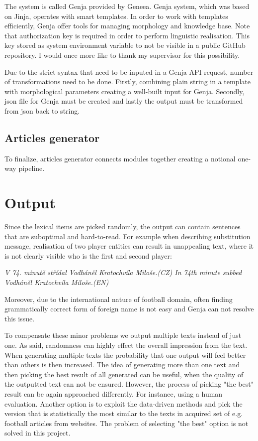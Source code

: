The system is called Genja provided by Geneea. Genja system, which was based on Jinja, operates with smart templates. In order to work with templates efficiently, Genja offer tools for managing morphology and knowledge base. Note that authorization key is required in order to perform linguistic realisation. This key stored as system environment variable to not be visible in a public GitHub repository. I would once more like to thank my supervisor for this possibility.

Due to the strict syntax that need to be inputed in a Genja API request, number of transformations need to be done. Firstly, combining plain string in a template with morphological parameters creating a well-built input for Genja. Secondly, json file for Genja must be created and lastly the output must be transformed from json back to string.

\subsection{Articles generator}
To finalize, articles generator connects modules together creating a notional one-way pipeline. 

\section{Output}
Since the lexical items are picked randomly, the output can contain sentences that are suboptimal and hard-to-read. For example when describing substitution message, realisation of two player entities can result in unappealing text, where it is not clearly visible who is the first and second player:
\begin{center}
	\textit{V 74. minutě střídal Vodháněl Kratochvíla Miloše.(CZ)}
	\textit{In 74th minute subbed Vodháněl Kratochvíla Miloše.(EN)}
\end{center}
Moreover, due to the international nature of football domain, often finding grammatically correct form of foreign name is not easy and Genja can not resolve this issue. 

To compensate these minor problems we output multiple texts instead of just one. As said, randomness can highly effect the overall impression from the text. When generating multiple texts the probability that one output will feel better than others is then increased. The idea of generating more than one text and then picking the best result of all generated can be useful, when the quality of the outputted text can not be ensured. However, the process of picking "the best" result can be again approached differently. For instance, using a human evaluation. Another option is to exploit the data-driven methods and pick the version that is statistically the most similar to the texts in acquired set of e.g. football articles from websites. The problem of selecting "the best" option is not solved in this project. 

